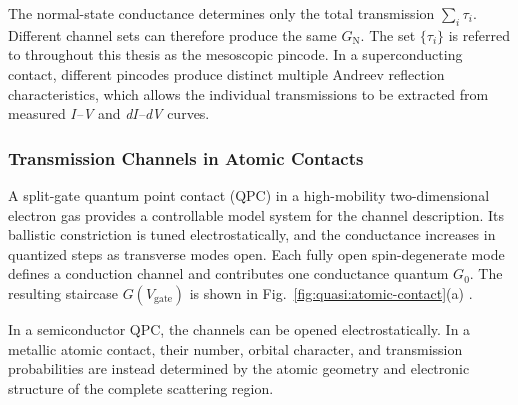             The normal-state conductance determines only the total transmission $\sum_i\tau_i$. Different channel sets can therefore produce the same $G_\mathrm{N}$. The set $\{\tau_i\}$ is referred to throughout this thesis as the mesoscopic pincode. In a superconducting contact, different pincodes produce distinct multiple Andreev reflection characteristics, which allows the individual transmissions to be extracted from measured \textit{I--V} and \textit{dI--dV} curves. \cite{scheer_conduction_1997,beenakker_random-matrix_1997}

        \subsubsection*{Transmission Channels in Atomic Contacts}

            A split-gate quantum point contact (QPC) in a high-mobility two-dimensional electron gas provides a controllable model system for the channel description. Its ballistic constriction is tuned electrostatically, and the conductance increases in quantized steps as transverse modes open. Each fully open spin-degenerate mode defines a conduction channel and contributes one conductance quantum $G_0$. The resulting staircase $G(V_\mathrm{gate})$ is shown in Fig.~\ref{fig:quasi:atomic-contact}(a) \cite{van_wees_quantized_1988,wharam_one-dimensional_1988}.

            In a semiconductor QPC, the channels can be opened electrostatically. In a metallic atomic contact, their number, orbital character, and transmission probabilities are instead determined by the atomic geometry and electronic structure of the complete scattering region.

